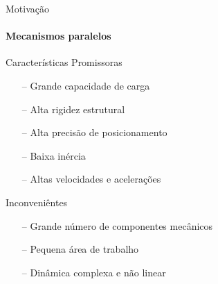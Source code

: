 \documentclass[25pt,landscape]{beamer}
\begin{document}
\begin{frame}
    \titlepage
\end{frame}








\begin{frame}{Motiva\c{c}\~ao}
    \framesubtitle{Mecanismos paralelos}
    \pause
    \begin{block}{Caracter\'isticas Promissoras}
    	\pause
        \begin{itemize} 
            \item[--] Grande capacidade de carga \\[8pt]
            \item[--] Alta rigidez estrutural \\[8pt]
            \item[--] Alta precis\~ao de posicionamento \\[8pt]
            \item[--] Baixa in\'ercia \\[8pt]
            \item[--] Altas velocidades e acelera\c{c}\~oes \\[8pt]
        \end{itemize}
    \end{block}
    \pause
    \begin{block}{Inconveni\^entes}
    	\pause
        \begin{itemize}
        	\item[--] Grande n\'umero de componentes mec\^anicos \\[8pt]
            \item[--] Pequena \'area de trabalho \\[8pt]
            \item[--] Din\^amica complexa e n\~ao linear \\[8pt]
        \end{itemize}
    \end{block}
\end{frame}
\end{document}
